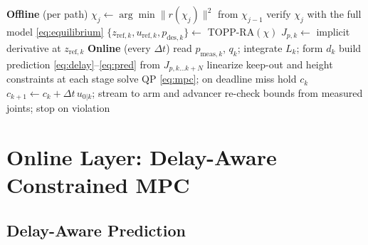 \documentclass[journal]{IEEEtran}
\begin{document}
\begin{algorithm}[t]
\caption{Offline--online framework}
\label{alg:framework}
\footnotesize
\begin{algorithmic}[1]
\Statex \textbf{Offline} (per path)
  \State $\chi_j\gets\arg\min\lVert r(\chi_j)\rVert^2$ from $\chi_{j-1}$ 
  \State verify $\chi_j$ with the full model \eqref{eq:equilibrium}
\EndFor
\State $\{z_{\mathrm{ref},k},u_{\mathrm{ref},k},p_{\mathrm{des},k}\}\gets$ TOPP-RA$(\chi)$ 
  \State $J_{p,k}\gets$ implicit derivative at $z_{\mathrm{ref},k}$ 
\EndFor
\Statex \textbf{Online} (every $\Delta t$)
\State read $p_{\mathrm{meas},k}$, $q_k$; integrate $L_k$; form $d_k$ \Comment{\eqref{eq:residual}}
\State build prediction \eqref{eq:delay}--\eqref{eq:pred} from $J_{p,k\ldots k+N}$
\State linearize keep-out and height constraints at each stage
\State solve QP \eqref{eq:mpc}; on deadline miss hold $c_k$ 
\State $c_{k+1}\gets c_k+\Delta t\,u_{0|k}$; stream to arm and advancer
\State re-check bounds from measured joints; stop on violation
\end{algorithmic}
\end{algorithm}

\section{Online Layer: Delay-Aware Constrained MPC}
\label{sec:online}

\subsection{Delay-Aware Prediction}
\label{sec:pred}
\end{document}
